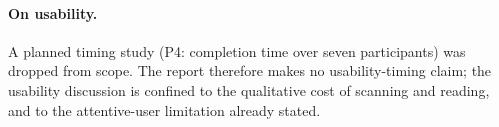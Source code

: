 \paragraph{On usability.}
A planned timing study (P4: completion time over seven participants) was dropped
from scope. The report therefore makes no usability-timing claim; the usability
discussion is confined to the qualitative cost of scanning and reading, and to
the attentive-user limitation already stated.
